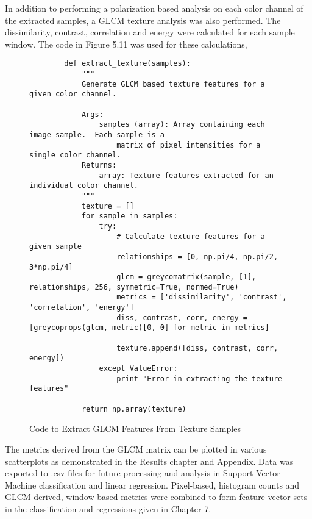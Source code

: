 In addition to performing a polarization based analysis on each color channel of the extracted samples, a GLCM texture analysis was also performed.  The dissimilarity, contrast, correlation and energy were calculated for each sample window.  The code in Figure 5.11 was used for these calculations,
\begin{figure}
    \begin{lstlisting}
        def extract_texture(samples):
            """
            Generate GLCM based texture features for a given color channel.

            Args:
                samples (array): Array containing each image sample.  Each sample is a
                    matrix of pixel intensities for a single color channel.
            Returns:
                array: Texture features extracted for an individual color channel.
            """
            texture = []
            for sample in samples:
                try:
                    # Calculate texture features for a given sample
                    relationships = [0, np.pi/4, np.pi/2, 3*np.pi/4]
                    glcm = greycomatrix(sample, [1], relationships, 256, symmetric=True, normed=True)
                    metrics = ['dissimilarity', 'contrast', 'correlation', 'energy']
                    diss, contrast, corr, energy = [greycoprops(glcm, metric)[0, 0] for metric in metrics]

                    texture.append([diss, contrast, corr, energy])
                except ValueError:
                    print "Error in extracting the texture features"

            return np.array(texture)
    \end{lstlisting}
    \caption{Code to Extract GLCM Features From Texture Samples}
    \label{fig:scattering}
\end{figure}
The metrics derived from the GLCM matrix can be plotted in various scatterplots as demonstrated in the Results chapter and Appendix. Data was exported to .csv files for future processing and analysis in Support Vector Machine classification and linear regression.
Pixel-based, histogram counts and GLCM derived, window-based metrics were combined to form feature vector sets in the classification and regressions given in Chapter 7.
